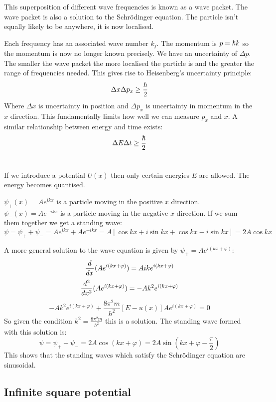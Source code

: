 This superposition of different wave frequencies is known as a wave packet. The wave packet is also a solution to the Schr\"odinger equation. The particle isn't equally likely to be anywhere, it is now localised.

Each frequency has an associated wave number \(k_j\). The momentum is \(p=\hb k\) so the momentum is now no longer known precisely. We have an uncertainty of \(\Delta p\). The smaller the wave packet the more localised the particle is and the greater the range of frequencies needed. This gives rise to Heisenberg's uncertainty principle:
\[\Delta x\Delta p_x\ge\frac\hb2\]
Where \(\Delta x\) is uncertainty in position and \(\Delta p_x\) is uncertainty in momentum in the \(x\) direction. This fundamentally limits how well we can measure \(p_x\) and \(x\). A similar relationship between energy and time exists:
\[\Delta E\Delta t\ge\frac\hb2\]

\section{}

If we introduce a potential \(U(x)\) then only certain energies \(E\) are allowed. The energy becomes quantised.

\(\psi_+(x)=Ae^{ikx}\) is a particle moving in the positive \(x\) direction. \(\psi_-(x)=Ae^{-ikx}\) is a particle moving in the negative \(x\) direction. If we sum them together we get a standing wave:
\[\psi=\psi_++\psi_-=Ae^{ikx}+Ae^{-ikx}=A[\cos kx+i\sin kx+\cos kx-i\sin kx]=2A\cos kx\]

A more general solution to the wave equation is given by \(\psi_+=Ae^{i(kx+\varphi)}\):
\[\diff x (Ae^{i(kx+\varphi)})=Aike^{i(kx+\varphi)}\]
\[\diff[2] x(Ae^{i(kx+\varphi)})=-Ak^2e^{i(kx+\varphi)}\]
\[-Ak^2e^{i(kx+\varphi)}+\frac{8\pi^2m}{h^2}[E-u(x)]Ae^{i(kx+\varphi)}=0\]
So given the condition \(k^2=\frac{8\pi^2m}{h^2}\) this is a solution.
The standing wave formed with this solution is:
\[\psi=\psi_++\psi_-=2A\cos(kx+\varphi)=2A\sin\left(kx+\varphi-\frac{\pi}{2}\right)\]
This shows that the standing waves which satisfy the Schr\"odinger equation are sinusoidal.

\subsection*{Infinite square potential}

